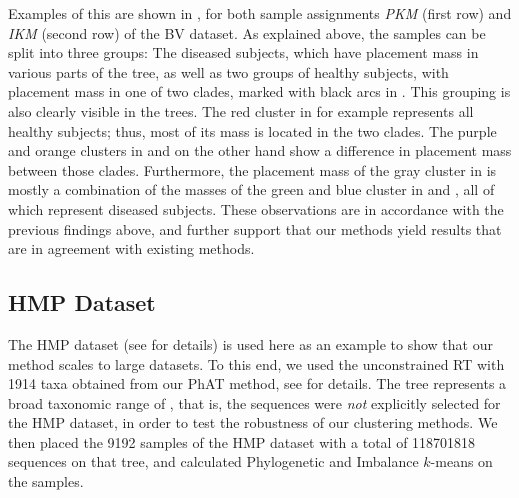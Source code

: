 Examples of this are shown in ,
for both sample assignments \emph{PKM} (first row) and \emph{IKM} (second row) of the \ac{BV} dataset.
As explained above, the samples can be split into three groups:
The diseased subjects, which have placement mass in various parts of the tree,
as well as two groups of healthy subjects, with placement mass in one of two  clades,
marked with black arcs in .
This grouping is also clearly visible in the trees.
The red cluster in  for example represents all healthy subjects;
thus, most of its mass is located in the two  clades.
The purple and orange clusters in  and 
on the other hand show a difference in placement mass between those clades.
Furthermore, the placement mass of the gray cluster in  is mostly
a combination of the masses of the green and blue cluster in  and ,
all of which represent diseased subjects.
These observations are in accordance with the previous findings above,
and further support that our methods yield results that are in agreement with existing methods.


\subsection{HMP Dataset}
\label{ch:Clustering:sec:Results:sub:HMPDataset}

The \acf{HMP} dataset (see  for details)
is used here as an example to show that our method scales to large datasets.
To this end, we used the unconstrained  \ac{RT} with \num{1 914} taxa
obtained from our \ac{PhAT} method, see  for details.
The tree represents a broad taxonomic range of ,
that is, the sequences were \emph{not} explicitly selected for the \ac{HMP} dataset,
in order to test the robustness of our clustering methods.
We then placed the \num{9 192} samples of the \ac{HMP} dataset with a total of \num{118 701 818} sequences on that tree,
and calculated Phylogenetic and Imbalance $k$-means on the samples.

